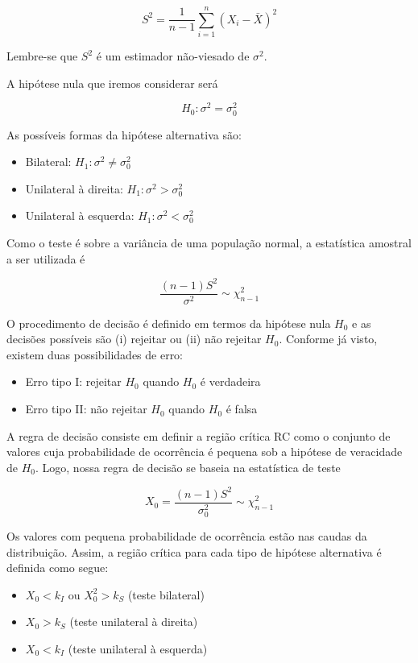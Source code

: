 \documentclass[
]{book}
\providecommand{\tightlist}{%
  \setlength{\itemsep}{0pt}\setlength{\parskip}{0pt}}
\begin{document}
\[S^2=\frac{1}{n-1}\sum_{i=1}^n(X_i-\bar X)^2\]

Lembre-se que \(S^2\) é um estimador não-viesado de \(\sigma^2\).

A hipótese nula que iremos considerar será

\[H_0:\sigma^2=\sigma^2_0\]

As possíveis formas da hipótese alternativa são:

\begin{itemize}
\tightlist
\item
  Bilateral: \(H_1:\sigma^2\neq \sigma^2_0\)
\item
  Unilateral à direita: \(H_1:\sigma^2 > \sigma^2_0\)
\item
  Unilateral à esquerda: \(H_1:\sigma^2 < \sigma^2_0\)
\end{itemize}

Como o teste é sobre a variância de uma população normal, a estatística amostral a ser utilizada é

\[\frac{(n-1)S^2}{\sigma^2}\sim \chi^2_{n-1}\]

O procedimento de decisão é definido em termos da hipótese nula \(H_0\) e as decisões possíveis são (i) rejeitar ou (ii) não rejeitar \(H_0\). Conforme já visto, existem duas possibilidades de erro:

\begin{itemize}
\tightlist
\item
  Erro tipo I: rejeitar \(H_0\) quando \(H_0\) é verdadeira
\item
  Erro tipo II: não rejeitar \(H_0\) quando \(H_0\) é falsa
\end{itemize}

A regra de decisão consiste em definir a região crítica RC como o conjunto de valores cuja probabilidade de ocorrência é pequena sob a hipótese de veracidade de \(H_0\). Logo, nossa regra de decisão se baseia na estatística de teste

\[X_0=\frac{(n-1)S^2}{\sigma^2_0}\sim \chi^2_{n-1}\]

Os valores com pequena probabilidade de ocorrência estão nas caudas da distribuição. Assim, a região crítica para cada tipo de hipótese alternativa é definida como segue:

\begin{itemize}
\tightlist
\item
  \(X_0<k_I\) ou \(X^2_0>k_S\) (teste bilateral)
\item
  \(X_0>k_S\) (teste unilateral à direita)
\item
  \(X_0<k_I\) (teste unilateral à esquerda)
\end{itemize}
\end{document}
